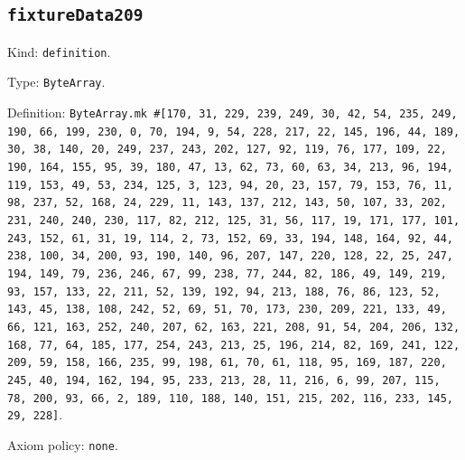 \documentclass[11pt]{article}
\begin{document}
\subsection*{\texttt{fixtureData209}}
\noindent Kind: \texttt{definition}.\par
\noindent Type: \texttt{ByteArray}.\par
\noindent Definition: \texttt{ByteArray.mk \#[170, 31, 229, 239, 249, 30, 42, 54, 235, 249, 190, 66, 199, 230, 0, 70, 194, 9, 54, 228, 217, 22, 145, 196, 44, 189, 30, 38, 140, 20, 249, 237, 243, 202, 127, 92, 119, 76, 177, 109, 22, 190, 164, 155, 95, 39, 180, 47, 13, 62, 73, 60, 63, 34, 213, 96, 194, 119, 153, 49, 53, 234, 125, 3, 123, 94, 20, 23, 157, 79, 153, 76, 11, 98, 237, 52, 168, 24, 229, 11, 143, 137, 212, 143, 50, 107, 33, 202, 231, 240, 240, 230, 117, 82, 212, 125, 31, 56, 117, 19, 171, 177, 101, 243, 152, 61, 31, 19, 114, 2, 73, 152, 69, 33, 194, 148, 164, 92, 44, 238, 100, 34, 200, 93, 190, 140, 96, 207, 147, 220, 128, 22, 25, 247, 194, 149, 79, 236, 246, 67, 99, 238, 77, 244, 82, 186, 49, 149, 219, 93, 157, 133, 22, 211, 52, 139, 192, 94, 213, 188, 76, 86, 123, 52, 143, 45, 138, 108, 242, 52, 69, 51, 70, 173, 230, 209, 221, 133, 49, 66, 121, 163, 252, 240, 207, 62, 163, 221, 208, 91, 54, 204, 206, 132, 168, 77, 64, 185, 177, 254, 243, 213, 25, 196, 214, 82, 169, 241, 122, 209, 59, 158, 166, 235, 99, 198, 61, 70, 61, 118, 95, 169, 187, 220, 245, 40, 194, 162, 194, 95, 233, 213, 28, 11, 216, 6, 99, 207, 115, 78, 200, 93, 66, 2, 189, 110, 188, 140, 151, 215, 202, 116, 233, 145, 29, 228]}.\par
\noindent Axiom policy: \texttt{none}.\par
\end{document}
